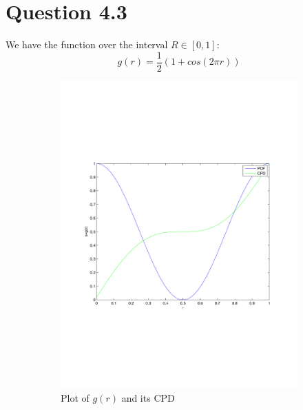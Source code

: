 \documentclass[a4paper]{article}
\begin{document}
\section*{Question 4.3}
We have the function over the interval $R \in [0,1]$:
\begin{equation}
    g(r) = \frac{1}{2}(1+cos(2\pi r))
    \label{eq:43}
\end{equation}
\begin{figure}[t]
    \centering

    \begin{subfigure}[b]{0.4\textwidth}
            \centering
            \includegraphics[width=\textwidth]{q3-plot.pdf}
            \caption{Plot of $g(r)$ and its CPD}
            \label{fig:43plot}
    \end{subfigure}\quad
    \begin{subfigure}[b]{0.4\textwidth}
            \centering

\end{subfigure}
\end{figure}
\end{document}
